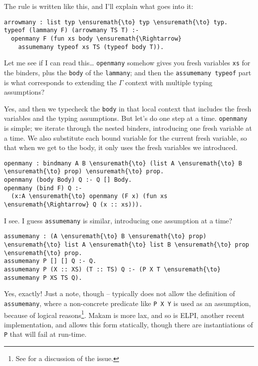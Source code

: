 \heroADVISOR{} The rule is written like this, and I'll explain what goes into
it:

\begin{verbatim}
arrowmany : list typ \ensuremath{\to} typ \ensuremath{\to} typ.
typeof (lammany F) (arrowmany TS T) :-
  openmany F (fun xs body \ensuremath{\Rightarrow}
    assumemany typeof xs TS (typeof body T)).
\end{verbatim}

\heroSTUDENT{} Let me see if I can read this\ldots{} \texttt{openmany} somehow
gives you fresh variables \texttt{xs} for the binders, plus the
\texttt{body} of the \texttt{lammany}; and then the
\texttt{assumemany\ typeof} part is what corresponds to extending the
\(\Gamma\) context with multiple typing assumptions?

\heroADVISOR{} Yes, and then we typecheck the \texttt{body} in that local
context that includes the fresh variables and the typing assumptions.
But let's do one step at a time. \texttt{openmany} is simple; we iterate
through the nested binders, introducing one fresh variable at a time. We
also substitute each bound variable for the current fresh variable, so
that when we get to the body, it only uses the fresh variables we
introduced.

\begin{verbatim}
openmany : bindmany A B \ensuremath{\to} (list A \ensuremath{\to} B \ensuremath{\to} prop) \ensuremath{\to} prop.
openmany (body Body) Q :- Q [] Body.
openmany (bind F) Q :-
  (x:A \ensuremath{\to} openmany (F x) (fun xs \ensuremath{\Rightarrow} Q (x :: xs))).
\end{verbatim}

\heroSTUDENT{} I see. I guess \texttt{assumemany} is similar, introducing one
assumption at a time?

\begin{verbatim}
assumemany : (A \ensuremath{\to} B \ensuremath{\to} prop) \ensuremath{\to} list A \ensuremath{\to} list B \ensuremath{\to} prop \ensuremath{\to} prop.
assumemany P [] [] Q :- Q.
assumemany P (X :: XS) (T :: TS) Q :- (P X T \ensuremath{\to} assumemany P XS TS Q).
\end{verbatim}

\heroADVISOR{} Yes, exactly! Just a note, though -- \lamprolog typically does
not allow the definition of \texttt{assumemany}, where a non-concrete
predicate like \texttt{P\ X\ Y} is used as an assumption, because of
logical
reasons\footnote{See \citet{assumemany-issue} for a discussion of the issue.}.
Makam is more lax, and so is ELPI, another recent
\lamprolog implementation, and allows this form statically, though there
are instantiations of \texttt{P} that will fail at run-time.

